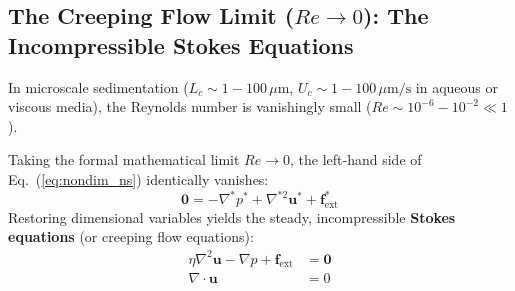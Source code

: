 \documentclass[11pt,a4paper]{article}
\begin{document}
\subsection{The Creeping Flow Limit ($Re \to 0$): The Incompressible Stokes Equations}
In microscale sedimentation ($L_c \sim 1 - 100\,\mu\text{m}$, $U_c \sim 1 - 100\,\mu\text{m/s}$ in aqueous or viscous media), the Reynolds number is vanishingly small ($Re \sim 10^{-6} - 10^{-2} \ll 1$). 

Taking the formal mathematical limit $Re \to 0$, the left-hand side of Eq.~(\ref{eq:nondim_ns}) identically vanishes:
\begin{equation}
    \mathbf{0} = -\nabla^* p^* + \nabla^{*2} \mathbf{u}^* + \mathbf{f}^*_{\text{ext}}
\end{equation}
Restoring dimensional variables yields the steady, incompressible \textbf{Stokes equations} (or creeping flow equations):
\begin{align}
    \eta \nabla^2 \mathbf{u} - \nabla p + \mathbf{f}_{\text{ext}} &= \mathbf{0} \label{eq:stokes_momentum} \\
    \nabla \cdot \mathbf{u} &= 0 \label{eq:stokes_continuity}
\end{align}
\end{document}
